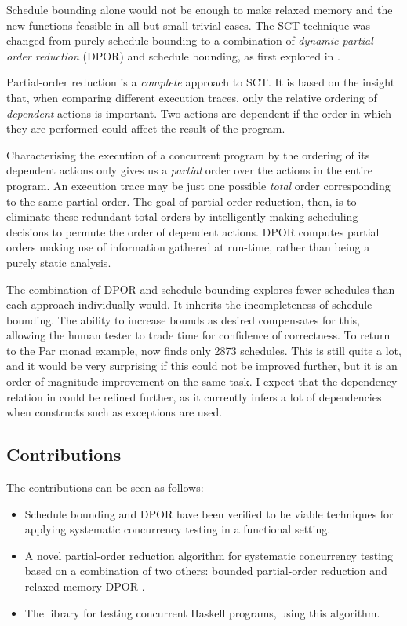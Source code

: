 Schedule bounding alone would not be enough to make relaxed memory and
the new functions feasible in all but small trivial cases. The SCT
technique was changed from purely schedule bounding to a combination
of \emph{dynamic partial-order reduction} (DPOR) and schedule
bounding, as first explored in \citep{bpor}.

Partial-order reduction \citep{por} is a \emph{complete} approach to
SCT. It is based on the insight that, when comparing different
execution traces, only the relative ordering of \emph{dependent}
actions is important. Two actions are dependent if the order in which
they are performed could affect the result of the program.

Characterising the execution of a concurrent program by the ordering
of its dependent actions only gives us a \emph{partial} order over the
actions in the entire program. An execution trace may be just one
possible \emph{total} order corresponding to the same partial
order. The goal of partial-order reduction, then, is to eliminate
these redundant total orders by intelligently making scheduling
decisions to permute the order of dependent actions. DPOR \citep{dpor}
computes partial orders making use of information gathered at
run-time, rather than being a purely static analysis.

The combination of DPOR and schedule bounding explores fewer schedules
than each approach individually would. It inherits the incompleteness
of schedule bounding. The ability to increase bounds as desired
compensates for this, allowing the human tester to trade time for
confidence of correctness. To return to the Par monad example,
\dejafu{} now finds only 2873 schedules. This is still quite a lot,
and it would be very surprising if this could not be improved further,
but it is an order of magnitude improvement on the same task. I expect
that the dependency relation in \dejafu{} could be refined further, as
it currently infers a lot of dependencies when constructs such as
exceptions are used.

\subsection{Contributions}
\label{sec:progress-dejafu-contribs}

The contributions can be seen as follows:

\begin{itemize}
\item Schedule bounding and DPOR have been verified to be viable
  techniques for applying systematic concurrency testing in a
  functional setting.

\item A novel partial-order reduction algorithm for systematic
  concurrency testing based on a combination of two others: bounded
  partial-order reduction \citep{bpor} and relaxed-memory DPOR
  \citep{rdpor}.

\item The \dejafu{} library for testing concurrent Haskell programs,
  using this algorithm.
\end{itemize}
